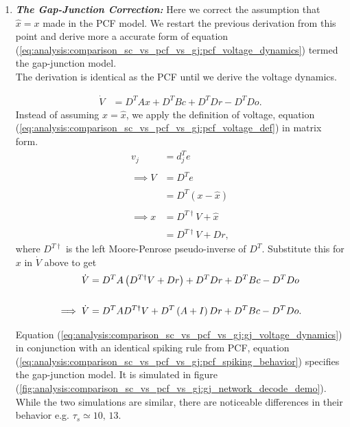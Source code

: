 \begin{enumerate}
\clearpage

\item 
\textbf{\textit{The Gap-Junction Correction:}} Here we correct the assumption that $\hat{x} = x$ made in the PCF model. We restart the previous derivation from this point and derive more a accurate form of equation (\ref{eq:analysis:comparison_sc_vs_pcf_vs_gj:pcf_voltage_dynamics}) termed the gap-junction model.\\
The derivation is identical as the PCF until we derive the voltage dynamics.

\begin{align*}
\dot{V} &= 
D^T A x
+
D^T B c
+ D^T D r
- D^T D o.
\end{align*}
Instead of assuming $x = \hat{x}$, we apply the definition of voltage, equation (\ref{eq:analysis:comparison_sc_vs_pcf_vs_gj:pcf_voltage_def}) in matrix form.
\begin{align*}
v_j &= d_j^T e 
%
\\
\\
%
\implies 
V &= D^T e
%
\\
\\
%
&= 
D^T 
\left(
x - \hat{x}
\right)
%
\\
\\
%
\implies
x 
&=
D^{T \dagger} V  + \hat{x}
%
\\
\\
%
&=
D^{T \dagger} V + D r,
\end{align*}
where $D^{T \dagger}$ is the left Moore-Penrose pseudo-inverse of $D^T$.
Substitute this for $x$ in $\dot{V}$ above to get
\begin{align}
\label{eq:analysis:comparison_sc_vs_pcf_vs_gj:gj_voltage_dynamics}
\dot{V} &= 
D^T A
\left(
	D^{T \dagger} V + D r
\right)
+ D^T D r
+
D^T B c
- D^T D o 
\notag
% 
\\ \notag
\\ 
%
\implies
\dot{V}
&= 
D^T A
D^{T \dagger} V 
+
D^T
\left(
	A + I 
\right)
D r
+ 
D^T B c
- D^T D o.
\end{align}

Equation (\ref{eq:analysis:comparison_sc_vs_pcf_vs_gj:gj_voltage_dynamics}) in conjunction with an identical spiking rule from PCF, equation (\ref{eq:analysis:comparison_sc_vs_pcf_vs_gj:pcf_spiking_behavior}) specifies the gap-junction model. It is simulated in figure (\ref{fig:analysis:comparison_sc_vs_pcf_vs_gj:gj_network_decode_demo}). While the two simulations are similar, there are noticeable differences in their behavior e.g. $\tau_s \simeq 10, \, 13$. 


\end{enumerate}
